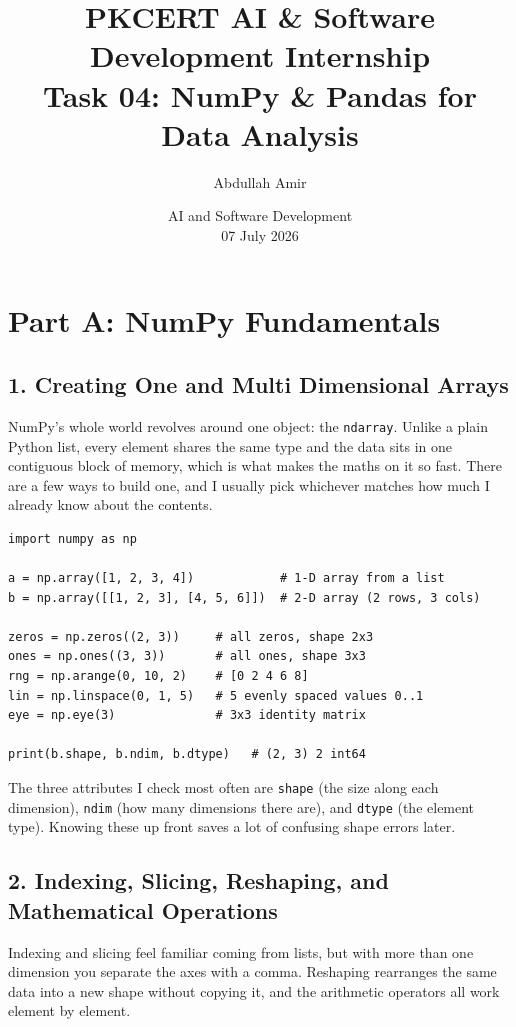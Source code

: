 \documentclass[11pt,a4paper]{article}
\title{\vspace{-1.5cm}\textbf{PKCERT AI \& Software Development Internship \\ Task 04: NumPy \& Pandas for Data Analysis}}
\author{Abdullah Amir}
\date{AI and Software Development \\ 07 July 2026}
\begin{document}
\maketitle
\vspace{-1cm}

\tableofcontents
\vspace{0.5cm}

\section*{Part A: NumPy Fundamentals}

\subsection*{1. Creating One and Multi Dimensional Arrays}
NumPy's whole world revolves around one object: the \texttt{ndarray}. Unlike a plain Python list, every element shares the same type and the data sits in one contiguous block of memory, which is what makes the maths on it so fast. There are a few ways to build one, and I usually pick whichever matches how much I already know about the contents.

\begin{lstlisting}[style=py, caption={Different ways to create NumPy arrays.}]
import numpy as np

a = np.array([1, 2, 3, 4])            # 1-D array from a list
b = np.array([[1, 2, 3], [4, 5, 6]])  # 2-D array (2 rows, 3 cols)

zeros = np.zeros((2, 3))     # all zeros, shape 2x3
ones = np.ones((3, 3))       # all ones, shape 3x3
rng = np.arange(0, 10, 2)    # [0 2 4 6 8]
lin = np.linspace(0, 1, 5)   # 5 evenly spaced values 0..1
eye = np.eye(3)              # 3x3 identity matrix

print(b.shape, b.ndim, b.dtype)   # (2, 3) 2 int64
\end{lstlisting}

The three attributes I check most often are \texttt{shape} (the size along each dimension), \texttt{ndim} (how many dimensions there are), and \texttt{dtype} (the element type). Knowing these up front saves a lot of confusing shape errors later.

\subsection*{2. Indexing, Slicing, Reshaping, and Mathematical Operations}
Indexing and slicing feel familiar coming from lists, but with more than one dimension you separate the axes with a comma. Reshaping rearranges the same data into a new shape without copying it, and the arithmetic operators all work element by element.
\end{document}
